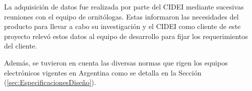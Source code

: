 La adquisición de datos fue realizada por parte del CIDEI mediante sucesivas reuniones con el equipo de ornitólogas. Estas informaron las necesidades del producto para llevar a cabo su investigación y el CIDEI como cliente de este proyecto relevó estos datos al equipo de desarrollo para fijar los requerimientos del cliente.

Además, se tuvieron en cuenta las diversas normas que rigen los equipos electrónicos vigentes en Argentina como se detalla en la Sección (\ref{sec:EspecificacionesDiseño}). 